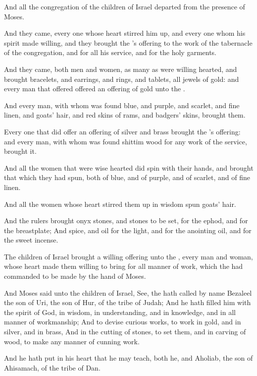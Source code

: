 \Verse And all the congregation of the children of Israel departed from the presence of Moses.

\Verse And they came, every one whose heart stirred him up, and every one whom his spirit made willing, and they brought the \LORD's offering to the work of the tabernacle of the congregation, and for all his service, and for the holy garments.

\Verse And they came, both men and women, as many as were willing hearted, and brought bracelets, and earrings, and rings, and tablets, all jewels of gold: and every man that offered offered an offering of gold unto the \LORD.

\Verse And every man, with whom was found blue, and purple, and scarlet, and fine linen, and goats' hair, and red skins of rams, and badgers' skins, brought them.

\Verse Every one that did offer an offering of silver and brass brought the \LORD's offering: and every man, with whom was found shittim wood for any work of the service, brought it.

\Verse And all the women that were wise hearted did spin with their hands, and brought that which they had spun, both of blue, and of purple, and of scarlet, and of fine linen.

\Verse And all the women whose heart stirred them up in wisdom spun goats' hair.

\Verse And the rulers brought onyx stones, and stones to be set, for the ephod, and for the breastplate; \Verse And spice, and oil for the light, and for the anointing oil, and for the sweet incense.

\Verse The children of Israel brought a willing offering unto the \LORD, every man and woman, whose heart made them willing to bring for all manner of work, which the \LORD had commanded to be made by the hand of Moses.

\Verse And Moses said unto the children of Israel, See, the \LORD hath called by name Bezaleel the son of Uri, the son of Hur, of the tribe of Judah; \Verse And he hath filled him with the spirit of God, in wisdom, in understanding, and in knowledge, and in all manner of workmanship; \Verse And to devise curious works, to work in gold, and in silver, and in brass, \Verse And in the cutting of stones, to set them, and in carving of wood, to make any manner of cunning work.

\Verse And he hath put in his heart that he may teach, both he, and Aholiab, the son of Ahisamach, of the tribe of Dan.


